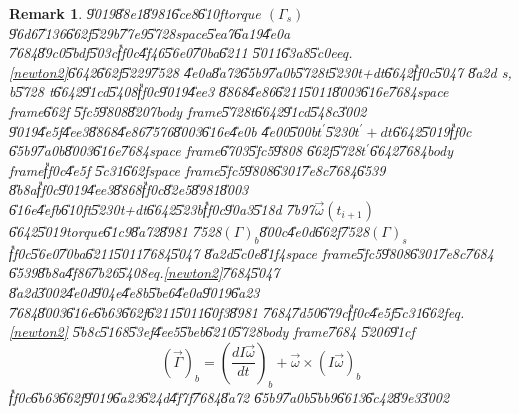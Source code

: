 \documentclass[12pt,a4paper]{article}
\newtheorem{remark}[theorem]{Remark}
\begin{document}
\begin{remark}
\U{9019}\U{88e1}\U{8981}\U{6ce8}\U{610f}torque $\left( \Gamma _{s}\right) $%
\U{96d6}\U{7136}\U{662f}\U{529b}\U{77e9}\U{5728}space\U{5ea7}\U{6a19}\U{4e0a}%
\U{7684}\U{89c0}\U{5bdf}\U{503c}\U{ff0c}\U{4f46}\U{56e0}\U{70ba}\U{6211}%
\U{5011}\U{63a8}\U{5c0e}eq.\ref{newton2}\U{6642}\U{662f}\U{5229}\U{7528}%
\U{4e0a}\U{8a72}\U{65b9}\U{7a0b}\U{5728}t\U{5230}t+dt\U{6642}\U{ff0c}\U{5047}%
\U{8a2d} s, b\U{5728} t\U{6642}\U{91cd}\U{5408}\U{ff0c}\U{9019}\U{4ee3}%
\U{8868}\U{4e86}\U{6211}\U{5011}\U{8003}\U{616e}\U{7684}space frame\U{662f}%
\U{5fc5}\U{9808}\U{8207}body frame\U{5728}t\U{6642}\U{91cd}\U{548c}\U{3002}%
\U{9019}\U{4e5f}\U{4ee3}\U{8868}\U{4e86}\U{7576}\U{8003}\U{616e}\U{4e0b}%
\U{4e00}\U{500b}$t^{\prime }$\U{5230}$t^{\prime }+dt$\U{6642}\U{5019}\U{ff0c}%
\U{65b9}\U{7a0b}\U{8003}\U{616e}\U{7684}space frame\U{6703}\U{5fc5}\U{9808}%
\U{662f}\U{5728}$t^{\prime }$\U{6642}\U{7684}body frame\U{ff0c}\U{4e5f}%
\U{5c31}\U{662f}space frame\U{5fc5}\U{9808}\U{6301}\U{7e8c}\U{7684}\U{6539}%
\U{8b8a}\U{ff0c}\U{9019}\U{4ee3}\U{8868}\U{ff0c}\U{82e5}\U{8981}\U{8003}%
\U{616e}\U{4efb}\U{610f}t\U{5230}t+dt\U{6642}\U{523b}\U{ff0c}\U{90a3}\U{518d}%
\U{7b97}$\vec{\omega}(t_{i+1})$\U{6642}\U{5019}torque\U{61c9}\U{8a72}\U{8981}%
\U{7528}$\left( \Gamma \right) _{b}$\U{800c}\U{4e0d}\U{662f}\U{7528}$\left(
\Gamma \right) _{s}$\U{ff0c}\U{56e0}\U{70ba}\U{6211}\U{5011}\U{7684}\U{5047}%
\U{8a2d}\U{5c0e}\U{81f4}space frame\U{5fc5}\U{9808}\U{6301}\U{7e8c}\U{7684}%
\U{6539}\U{8b8a}\U{4f86}\U{7b26}\U{5408}eq.\ref{newton2}\U{7684}\U{5047}%
\U{8a2d}\U{3002}\U{4e0d}\U{904e}\U{4e8b}\U{5be6}\U{4e0a}\U{9019}\U{6a23}%
\U{7684}\U{8003}\U{616e}\U{6b63}\U{662f}\U{6211}\U{5011}\U{60f3}\U{8981}%
\U{7684}\U{7d50}\U{679c}\U{ff0c}\U{4e5f}\U{5c31}\U{662f}eq.\ref{newton2}%
\U{5b8c}\U{5168}\U{53ef}\U{4ee5}\U{5beb}\U{6210}\U{5728}body frame\U{7684}%
\U{5206}\U{91cf}%
\begin{equation}
\left( \vec{\Gamma}\right) _{b}=\left( \frac{dI\vec{\omega}}{dt}\right) _{b}+%
\vec{\omega}\times \left( I\vec{\omega}\right) _{b}
\end{equation}%
\U{ff0c}\U{6b63}\U{662f}\U{9019}\U{6a23}\U{624d}\U{4f7f}\U{7684}\U{8a72}%
\U{65b9}\U{7a0b}\U{5bb9}\U{6613}\U{6c42}\U{89e3}\U{3002}
\end{remark}
\end{document}
